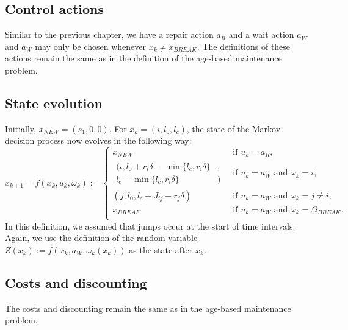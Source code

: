 \subsection{Control actions}
Similar to the previous chapter, we have a repair action $a_R$ and a wait action $a_W$ and $a_W$ may only be chosen whenever $x_k\neq x_{BREAK}$.
The definitions of these actions remain the same as in the definition of the age-based maintenance problem.

\subsection{State evolution}
Initially, $x_{NEW}=(s_1,0,0)$.
For $x_k=(i,l_0,l_c)$, the state of the Markov decision process now evolves in the following way:
\[
x_{k+1}=f(x_k, u_k, \omega_k):=\begin{cases}
x_{NEW}&\ \text{if }u_k=a_R,\\
\begin{split}(i,l_0+r_i\delta-\min\{l_c,r_i\delta\}&,\\l_c-\min\{l_c,r_i\delta\}&)\end{split}&\ \text{if }u_k=a_W\text{ and }\omega_k=i,\\
(j,l_0,l_c+J_{ij}-r_j\delta)&\ \text{if }u_k=a_W\text{ and }\omega_k=j\neq i,\\
x_{BREAK}&\ \text{if }u_k=a_W\text{ and }\omega_k=\Omega_{BREAK}.\\
\end{cases}
\]
In this definition, we assumed that jumps occur at the start of time intervals.
Again, we use the definition of the random variable $Z(x_k):=f(x_k,a_W,\omega_k(x_k))$ as the state after $x_k$.

\subsection{Costs and discounting}
The costs and discounting remain the same as in the age-based maintenance problem.

